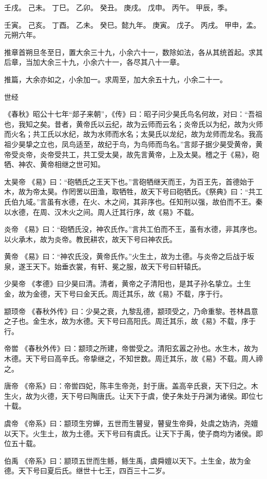 \documentclass[]{article}
\begin{document}
壬戌。 己未。 丁巳。 乙卯。 癸丑。 庚戌。 戊申。 丙午。 甲辰，季。

壬寅。 己亥。 丁酉。 乙未。 癸巳。懿九年。 庚寅。 戊子。 丙戌。
甲申，孟。元朔六年。

推章首朔旦冬至日，置大余三十九，小余六十一，数除如法，各从其统首起。求其后章，当加大余三十九，小余六十一，各尽其八十一章。

推篇，大余亦如之，小余加一。求周至，加大余五十九，小余二十一。

世经

《春秋》昭公十七年``郯子来朝''，《传》曰：昭子问少昊氏鸟名何故，对曰：``吾祖也，我知之矣。昔者，黄帝氏以云纪，故为云师而云名；炎帝氏以为纪，故为火师而火名；共工氏以水纪，故为水师而水名；太昊氏以龙纪，故为龙师而龙名。我高祖少昊挚之立也，凤鸟适至，故纪于鸟，为鸟师而鸟名。''言郯子据少昊受黄帝，黄帝受炎帝，炎帝受共工，共工受太昊，故先言黄帝，上及太昊。稽之于《易》，砲牺、神农、黄帝相继之世可知。

太昊帝
《易》曰：``砲牺氏之王天下也。''言砲牺继天而王，为百王先，首德始于木，故为帝太昊。作罔罟以田渔，取牺牲，故天下号曰砲牺氏。《祭典》曰：``共工氏伯九域。''言虽有水德，在火、木之间，其非序也。任知刑以强，故伯而不王。秦以水德，在周、汉木火之间。周人迁其行序，故《易》不载。

炎帝
《易》曰：``砲牺氏没，神农氏作。''言共工伯而不王，虽有水德，非其序也。以火承木，故为炎帝。教民耕农，故天下号曰神农氏。

黄帝
《易》曰：``神农氏没，黄帝氏作。''火生土，故为土德。与炎帝之后战于坂泉，遂王天下。始垂衣裳，有轩、冕之服，故天下号曰轩辕氏。

少昊帝
《孝德》曰少昊曰清。清者，黄帝之子清阳也，是其子孙名挚立。土生金，故为金德，天下号曰金天氏。周迁其乐，故《易》不载，序于行。

颛顼帝
《春秋外传》曰：少昊之衰，九黎乱德，颛顼受之，乃命重黎。苍林昌意之子也。金生水，故为水德。天下号曰高阳氏。周迁其乐，故《易》不载，序于行。

帝喾
《春秋外传》曰：颛顼之所建，帝喾受之。清阳玄嚣之孙也。水生木，故为木德。天下号曰高辛氏。帝挚继之，不知世数。周迁其乐，故《易》不载。周人禘之。

唐帝
《帝系》曰：帝喾四妃，陈丰生帝尧，封于唐。盖高辛氏衰，天下归之。木生火，故为火德，天下号曰陶唐氏。让天下于虞，使子朱处于丹渊为诸侯。即位七十载。

虞帝
《帝系》曰：颛顼生穷蝉，五世而生瞽叟，瞽叟生帝舜，处虞之妫汭，尧嬗以天下。火生土，故为土德。天下号曰有虞氏。让天下于禹，使子商均为诸侯。即位五十载。

伯禹
《帝系》曰：颛顼五世而生鲧，鲧生禹，虞舜嬗以天下。土生金，故为金德。天下号曰夏后氏。继世十七王，四百三十二岁。
\end{document}

